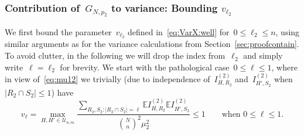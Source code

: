 \documentclass{article}
\newcommand{\E}{\mathbb{E}}
\newcommand{\T}{\mathcal{U}_{n,m}}
\newcommand{\itwo}{I^{(2)}}
\renewcommand{\v}{v}
\begin{document}
\subsubsection{Contribution of~$G_{N,p_2}$ to variance: Bounding $\v_{\ell_2}$}\label{sec:vell}
We first bound the parameter~$v_{\ell_2}$ defined in~\eqref{eq:VarX:well} for~$0 \le \ell_2 \le n$, using similar arguments as for the variance calculations from Section~\ref{sec:proofcontain}. 
To avoid clutter, in the following we will drop the index from~$\ell_2$ and simply write~$\ell=\ell_2$ for brevity. 
We start with the pathological case~$0 \le \ell \le 1$, where in view of~\eqref{eq:mu12} we trivially (due to independence of~$\itwo_{H,R_2}$ and~$\itwo_{H',S_2}$ when~$|R_2\cap S_2| \le 1$) have
\begin{equation}\label{eq:vell:patho}
v_{\ell} = \max_{H,H'\in \T} \frac{\sum_{R_2,S_2:|R_2\cap S_2|=\ell}\E \itwo_{H,R_2} \E \itwo_{H',S_2}}{\binom{N}{n}^2\mu_2^2} \le 1 \qquad \text{when~$0 \le \ell \le 1$.}
\end{equation}
\end{document}
